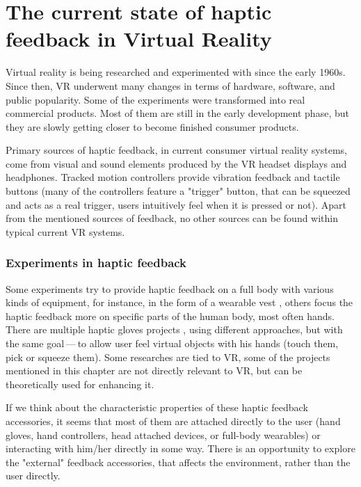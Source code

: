 \chapter{The current state of haptic feedback in Virtual Reality}

Virtual reality is being researched and experimented with since the early 1960s.
\hyperlink{vrhistory}{} Since then, VR underwent many changes in terms of hardware,
software, and public popularity.
Some of the experiments were transformed into real commercial products.
Most of them are still in the early development phase, but they are slowly getting
closer to become finished consumer products.


Primary sources of haptic feedback, in current consumer virtual reality systems,
come from visual and sound elements produced by the VR headset displays and
headphones. Tracked
motion controllers provide vibration feedback and tactile buttons (many of
the controllers feature a "trigger" button, that can be squeezed and acts as
a real trigger, users intuitively feel when it is pressed or not).
Apart from the mentioned sources of feedback, no other sources can be found
within typical current VR systems.


\hypertarget{x-experiments-in-haptic-feedback}{\subsection*{Experiments in haptic feedback}}
Some experiments try to provide haptic feedback on a full body with various
kinds of equipment, for instance, in the form of a wearable vest \hyperlink{tfbhf}{},
others focus the haptic feedback more on specific parts of the
human body, most often hands. There are multiple haptic gloves projects
\hyperlink{haptgloves}{}, using different approaches, but with the same goal — to allow user feel virtual objects with his hands
(touch them, pick or squeeze them). Some researches are tied to VR,
some of the projects mentioned in this chapter are not directly relevant
to VR, but can be theoretically used for enhancing it.


If we think about the characteristic properties of these haptic feedback
accessories, it seems that most of them are attached directly to the
user (hand gloves, hand controllers, head attached devices, or full-body wearables)
or interacting with him/her directly in some way. There is an opportunity to explore
the "external" feedback accessories, that affects the environment, rather than
the user directly.



